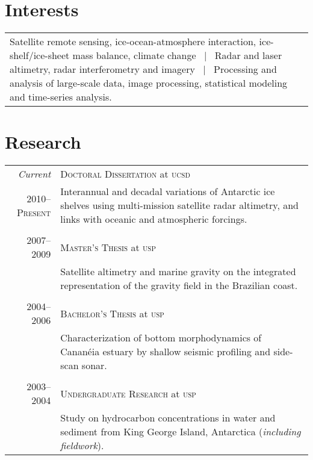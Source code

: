\documentclass[a4paper,11pt]{article}
\begin{document}

\section{Interests}

\begin{tabular}{p{}}
Satellite remote sensing, ice-ocean-atmosphere interaction, ice-shelf/ice-sheet mass balance, climate change ~|~ Radar and laser altimetry, radar interferometry and imagery ~|~ Processing and analysis of large-scale data, image processing, statistical modeling and time-series analysis.
\end{tabular}


\section{Research}

\begin{tabular}{r|p{12.4cm}}
\emph{Current} & \textsc{Doctoral Dissertation} at \textsc{ucsd} \\
2010--\textsc{Present} & \small{Interannual and decadal variations of Antarctic ice shelves using multi-mission satellite radar altimetry, and links with oceanic and atmospheric forcings.}\\
\multicolumn{2}{c}{} \\


2007--2009 & \textsc{Master's Thesis} at \textsc{usp}\\
& \small{Satellite altimetry and marine gravity on the integrated representation of the gravity field in the Brazilian coast.}\\
\multicolumn{2}{c}{} \\


2004--2006 & \textsc{Bachelor's Thesis} at \textsc{usp}\\
& \small{Characterization of bottom morphodynamics of Canan\'eia estuary by shallow seismic profiling and side-scan sonar.}\\
\multicolumn{2}{c}{} \\


2003--2004 & \textsc{Undergraduate Research} at \textsc{usp}\\
& \small{Study on hydrocarbon concentrations in water and sediment from King George Island, Antarctica (\emph{including fieldwork}).}
\end{tabular}
\end{document}
